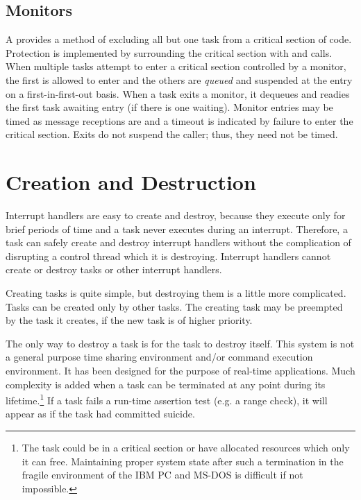 \subsection{Monitors}
A  provides a method of excluding all but one task from a
critical section of code.
Protection is implemented by
surrounding the critical section with  and 
 calls.  
When multiple tasks attempt to enter a critical section controlled by 
a monitor, the first is allowed to enter and the others are 
{\em queued} and suspended at the entry on a first-in-first-out basis.
When a task exits a monitor, it dequeues and readies the first task 
awaiting entry (if there is one waiting).  
Monitor entries may be timed as message
receptions are and a timeout is indicated by failure to enter the critical
section.  Exits do not suspend the caller; thus, they need not be timed.

\section{Creation and Destruction}
Interrupt handlers are 
easy to create and destroy, because they execute only for brief periods of
time and a task never executes during an interrupt.  Therefore, a task 
can safely create and destroy interrupt handlers without the complication
of disrupting a control thread which it is destroying.
Interrupt handlers cannot create or destroy tasks or other interrupt handlers.

Creating tasks is quite simple, but destroying them is a little more
complicated.  Tasks can be created only by other tasks. 
The creating task may be preempted by the task it creates, 
if the new task is of higher priority.

The only way to destroy a task is for the task to destroy itself.
This system is not a general purpose time sharing environment and/or
command execution environment.  It has been designed for 
the purpose of real-time applications.   Much complexity is added when
a task can be terminated at any point during its lifetime.\footnote{
    The task could be in a critical section or have allocated resources
    which only it can free.  Maintaining proper system state after such
    a termination in the fragile environment of the IBM PC and MS-DOS is 
    difficult if not impossible.}
If a task fails a run-time assertion test (e.g. a range check), 
it will appear as if the task had committed suicide.

